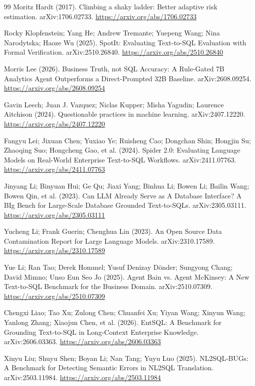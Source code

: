 \begin{thebibliography}{99}
 Moritz Hardt (2017). Climbing a shaky ladder: Better adaptive risk estimation. arXiv:1706.02733. \url{https://arxiv.org/abs/1706.02733}

 Rocky Klopfenstein; Yang He; Andrew Tremante; Yuepeng Wang; Nina Narodytska; Haoze Wu (2025). SpotIt: Evaluating Text-to-SQL Evaluation with Formal Verification. arXiv:2510.26840. \url{https://arxiv.org/abs/2510.26840}

 Morris Lee (2026). Business Truth, not SQL Accuracy: A Rule-Gated 7B Analytics Agent Outperforms a Direct-Prompted 32B Baseline. arXiv:2608.09254. \url{https://arxiv.org/abs/2608.09254}

 Gavin Leech; Juan J. Vazquez; Niclas Kupper; Misha Yagudin; Laurence Aitchison (2024). Questionable practices in machine learning. arXiv:2407.12220. \url{https://arxiv.org/abs/2407.12220}

 Fangyu Lei; Jixuan Chen; Yuxiao Ye; Ruisheng Cao; Dongchan Shin; Hongjin Su; Zhaoqing Suo; Hongcheng Gao, et al. (2024). Spider 2.0: Evaluating Language Models on Real-World Enterprise Text-to-SQL Workflows. arXiv:2411.07763. \url{https://arxiv.org/abs/2411.07763}

 Jinyang Li; Binyuan Hui; Ge Qu; Jiaxi Yang; Binhua Li; Bowen Li; Bailin Wang; Bowen Qin, et al. (2023). Can LLM Already Serve as A Database Interface? A BIg Bench for Large-Scale Database Grounded Text-to-SQLs. arXiv:2305.03111. \url{https://arxiv.org/abs/2305.03111}

 Yucheng Li; Frank Guerin; Chenghua Lin (2023). An Open Source Data Contamination Report for Large Language Models. arXiv:2310.17589. \url{https://arxiv.org/abs/2310.17589}

 Yue Li; Ran Tao; Derek Hommel; Yusuf Denizay Dönder; Sungyong Chang; David Mimno; Unso Eun Seo Jo (2025). Agent Bain vs. Agent McKinsey: A New Text-to-SQL Benchmark for the Business Domain. arXiv:2510.07309. \url{https://arxiv.org/abs/2510.07309}

 Chengxi Liao; Tao Xu; Zulong Chen; Chuanfei Xu; Yiyan Wang; Xinyun Wang; Yanlong Zhang; Xiaojun Chen, et al. (2026). EntSQL: A Benchmark for Grounding Text-to-SQL in Long-Context Enterprise Knowledge. arXiv:2606.03363. \url{https://arxiv.org/abs/2606.03363}

 Xinyu Liu; Shuyu Shen; Boyan Li; Nan Tang; Yuyu Luo (2025). NL2SQL-BUGs: A Benchmark for Detecting Semantic Errors in NL2SQL Translation. arXiv:2503.11984. \url{https://arxiv.org/abs/2503.11984}


\end{thebibliography}
